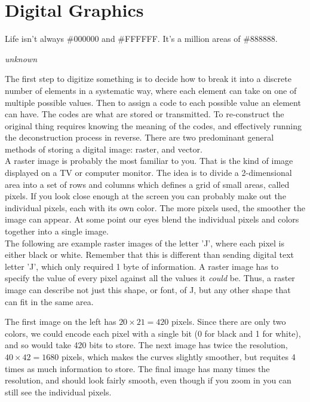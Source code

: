\section{Digital Graphics}

\epigraph{Life isn't always \#000000 and \#FFFFFF. It's a million areas of \#888888.}{\textit{unknown}}

The first step to digitize something is to decide how to break it into a discrete number of elements in a systematic way, where each element can take on one of multiple possible values. Then to assign a code to each possible value an element can have. The codes are what are stored or transmitted. To re-construct the original thing requires knowing the meaning of the codes, and effectively running the deconstruction process in reverse. There are two predominant general methods of storing a digital image: raster, and vector.\\

A raster image is probably the most familiar to you. That is the kind of image displayed on a TV or computer monitor. The idea is to divide a 2-dimensional area into a set of rows and columns which defines a grid of small areas, called pixels. If you look close enough at the screen you can probably make out the individual pixels, each with its own color. The more pixels used, the smoother the image can appear. At some point our eyes blend the individual pixels and colors together into a single image.\\

The following are example raster images of the letter 'J', where each pixel is either black or white. Remember that this is different than sending digital text letter 'J', which only required 1 byte of information. A raster image has to specify the value of every pixel against all the values it \textit{could} be. Thus, a raster image can describe not just this shape, or font, of J, but any other shape that can fit in the same area.\\

\begin{center}\end{center}

The first image on the left has \(20\times21=420\) pixels. Since there are only two colors, we could encode each pixel with a single bit (0 for black and 1 for white), and so would take 420 bits to store. The next image has twice the resolution, \(40\times42=1680 \) pixels, which makes the curves slightly smoother, but requites 4 times as much information to store. The final image has many times the resolution, and should look fairly smooth, even though if you zoom in you can still see the individual pixels.\\

